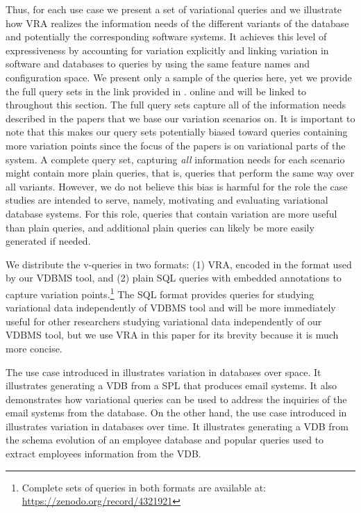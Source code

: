 %
Thus, for each use case we present a set of variational queries 
and we illustrate how VRA realizes the
information needs of the different variants of the database and potentially the 
corresponding software systems.
%
It achieves this level of expressiveness by accounting 
for variation explicitly and linking variation in software and databases to
queries by using the same feature names and configuration space.
%
We present only a  sample of the queries here,
yet we provide the full query sets in the link provided in .
online and will be linked to throughout this
section.
The full query sets capture all of the information needs described in the
papers that  we base our variation scenarios on. It is important to note that
this makes our query sets potentially biased toward queries containing more
variation points since the focus of the papers is on variational parts of the
system. A complete query set, capturing \emph{all}
information needs for each scenario might contain more plain queries, that is,
queries that perform the same way over all variants.
%
However, we do not believe this bias is harmful for the role the case studies
are intended to serve, namely, motivating and evaluating variational database
systems. For this role, queries that contain variation are more useful than
plain queries, and additional plain queries can likely be more easily generated
if needed.

We distribute the v-queries in two formats: (1) VRA,
encoded in the format used by
our VDBMS tool, and (2) plain SQL queries with embedded 
annotations to capture variation points.\footnote{Complete sets of queries in both formats are available at: \url{https://zenodo.org/record/4321921}} 
%
The SQL format provides queries for studying variational data 
independently of VDBMS tool and
will be more immediately useful for other researchers
studying variational data independently of our VDBMS tool, 
but we use VRA in
this paper for its brevity
because it is much more concise.

The use case introduced in  illustrates variation in databases over space. 
It illustrates generating a VDB from a SPL that produces email systems. It also demonstrates
how variational queries can be used to address the inquiries of the email systems from the
database. 
On the other hand, the use case introduced in  illustrates variation in 
databases over time. It illustrates generating a VDB from the schema evolution of 
an employee database and popular queries used to extract employees information
from the VDB.








